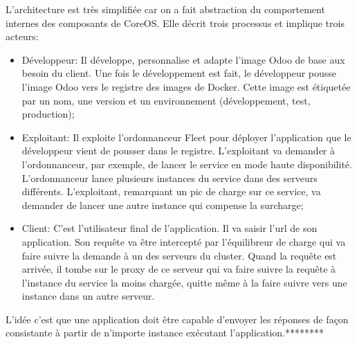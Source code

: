 \begin{onehalfspace}
L'architecture est très simplifiée car on a fait abstraction du comportement internes des composants de CoreOS. Elle décrit trois processus et implique trois acteurs:


\begin{itemize}
 	\item Développeur: Il développe, personnalise et adapte l'image Odoo de base aux besoin du client. Une fois le développement est fait, le développeur pousse l'image Odoo vers le registre des images de Docker. Cette image est étiquetée par un nom, une version et un environnement (développement, test, production);
 	\item Exploitant: Il exploite l'ordonnanceur Fleet pour déployer l'application que le développeur vient de pousser dans le registre. L'exploitant va demander à l'ordonnanceur, par exemple, de lancer le service en mode haute disponibilité. L'ordonnanceur lance plusieurs instances du service dans des serveurs différents. L'exploitant, remarquant un pic de charge sur ce service, va demander de lancer une autre instance qui compense la surcharge;
 	\item Client: C'est l'utilisateur final de l'application. Il va saisir l'\acrshort{url} de son application. Son requête va être intercepté par l'équilibreur de charge qui va faire suivre la demande à un des serveurs du cluster. Quand la requête est arrivée, il tombe sur le proxy de ce serveur qui va faire suivre la requête à l'instance du service la moins chargée, quitte même à la faire suivre vers une instance dans un autre serveur.
 \end{itemize} 


L'idée c'est que une application doit être capable d'envoyer les réponses de façon consistante à partir de n'importe instance exécutant l'application.********


\end{onehalfspace}
